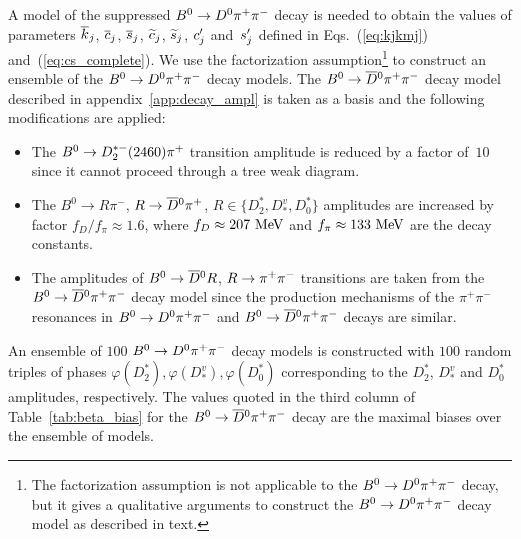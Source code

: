 \documentclass[a4paper,11pt]{article}
\begin{document}
A model of the suppressed $B^0\to D^0\pi^+\pi^-$ 
decay is needed to obtain the values of parameters 
$\overline{k}_j$, $\overline{c}_j$, $\overline{s}_j$, $\widetilde{c}_j$, $\widetilde{s}_j$, $c^{\prime}_j$ and~$s^{\prime}_j$ 
defined in Eqs.~(\ref{eq:kjkmj}) and~(\ref{eq:cs_complete}).  We use  the  
factorization assumption\footnote{The factorization assumption 
is not applicable to the $B^0\to D^0\pi^+\pi^-$ decay, but it gives a qualitative arguments 
to construct the $B^0\to D^0\pi^+\pi^-$ decay model as described in text.} 
to construct an ensemble of the $B^0\to D^0\pi^+\pi^-$ decay models. The $B^0\to\overline{D}{}^0\pi^+\pi^-$ decay model 
described in appendix~\ref{app:decay_ampl} is taken as a basis and the following 
modifications are applied:
\begin{itemize}
 \item The $B^0\to D_2^{*-}(2460)\pi^+$ transition amplitude is reduced by a 
 factor of~$10$ since it cannot proceed through a tree weak diagram.
 \item The $B^0\to R\pi^-$, $R\to\overline{D}{}^0\pi^+$, $R\in\{D^*_2, D^v_*, D_0^*\}$ 
 amplitudes are increased by factor $f_D / f_{\pi} \approx 1.6$, where 
 $f_D\approx207\ \mathrm{MeV}$ and $f_{\pi}\approx133\ \mathrm{MeV}$ are the decay constants.
 \item The amplitudes of $B^0\to \overline{D}{}^0 R$, $R\to\pi^+\pi^-$ transitions are taken from the $B^0\to\overline{D}{}^0\pi^+\pi^-$ 
 decay model since the production mechanisms of the $\pi^+\pi^-$ resonances in $B^0\to D^0\pi^+\pi^-$ and
 $B^0\to\overline{D}{}^0\pi^+\pi^-$ decays are similar.
\end{itemize}
An ensemble of $100$ $B^0\to D^0\pi^+\pi^-$ decay models is constructed with 
$100$ random triples of phases $\varphi(D^*_2), \varphi(D^v_*), \varphi(D_0^*)$ 
corresponding to the $D^*_2$, $D^v_*$ and $D_0^*$ amplitudes, respectively.  
The values quoted in the third column of Table~\ref{tab:beta_bias} for the 
$B^0\to\overline{D}{}^0\pi^+\pi^-$ decay are the maximal biases over the ensemble of models.
\end{document}
